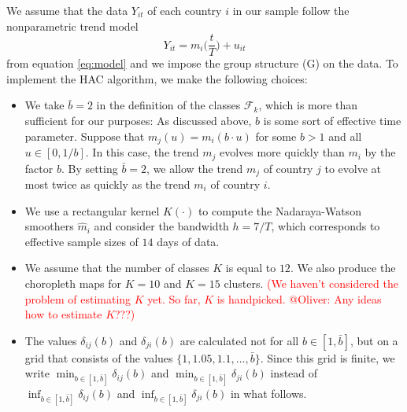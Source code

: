 \documentclass[a4paper,12pt]{article}
\numberwithin{equation}{section}
\begin{document}
We assume that the data $Y_{it}$ of each country $i$ in our sample follow the nonparametric trend model 
\[ Y_{it} = m_i\Big(\frac{t}{T}\Big) + u_{it} \]
from equation \eqref{eq:model} and we impose the group structure (G) on the data. 
To implement the HAC algorithm, we make the following choices:
\begin{itemize}[leftmargin=0.6cm]
\item We take $\bar{b} = 2$ in the definition of the classes $\mathcal{F}_k$, which is more than sufficient for our purposes: As discussed above, $b$ is some sort of effective time parameter. Suppose that $m_j(u) = m_i(b \cdot u)$ for some $b > 1$ and all $u \in [0,1/b]$. In this case, the trend $m_j$ evolves more quickly than $m_i$ by the factor $b$. By setting $\bar{b} = 2$, we allow the trend $m_j$ of country $j$ to evolve at most twice as quickly as the trend $m_i$ of country $i$.  
\item We use a rectangular kernel $K(\cdot)$ to compute the Nadaraya-Watson smoothers $\hat{m}_{i}$ and consider the bandwidth $h = 7/T$, which corresponds to effective sample sizes of $14$ days of data. 
\item We assume that the number of classes $K$ is equal to $12$. We also produce the choropleth maps for $K=10$ and $K = 15$ clusters. \textcolor{red}{(We haven't considered the problem of estimating $K$ yet. So far, $K$ is handpicked. @Oliver: Any ideas how to estimate $K$???)}
\item The values $\delta_{ij}(b)$ and $\delta_{ji}(b)$ are calculated not for all $b\in [1, \bar{b}]$, but on a grid that consists of the values $\{1, 1.05, 1.1, \ldots, \bar{b}\}$. Since this grid is finite, we write $\min_{b \in [1, \bar{b}]} \delta_{ij}(b)$ and $\min_{b \in [1, \bar{b}]} \delta_{ji}(b)$ instead of $\inf_{b \in [1, \bar{b}]} \delta_{ij}(b)$ and $\inf_{b \in [1, \bar{b}]} \delta_{ji}(b)$ in what follows.
\end{itemize}
\end{document}
